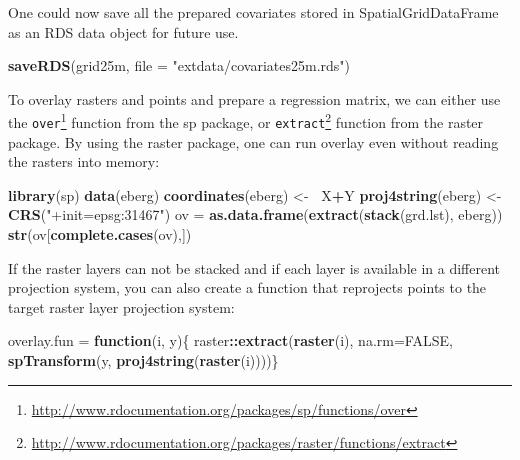 \documentclass[11pt]{krantz}
\newenvironment{Shaded}{\begin{snugshade}}{\end{snugshade}}
\newcommand{\ControlFlowTok}[1]{\textcolor[rgb]{0.27,0.27,0.27}{\textbf{#1}}}
\newcommand{\DataTypeTok}[1]{\textcolor[rgb]{0.27,0.27,0.27}{#1}}
\newcommand{\ErrorTok}[1]{\textcolor[rgb]{0.14,0.14,0.14}{\textbf{#1}}}
\newcommand{\KeywordTok}[1]{\textcolor[rgb]{0.27,0.27,0.27}{\textbf{#1}}}
\newcommand{\NormalTok}[1]{#1}
\newcommand{\OperatorTok}[1]{\textcolor[rgb]{0.43,0.43,0.43}{\textbf{#1}}}
\newcommand{\OtherTok}[1]{\textcolor[rgb]{0.37,0.37,0.37}{#1}}
\newcommand{\StringTok}[1]{\textcolor[rgb]{0.5,0.5,0.5}{#1}}
\renewcommand{\href}[2]{#2\footnote{\url{#1}}}
\theoremstyle{definition}
\theoremstyle{definition}
\theoremstyle{definition}
\theoremstyle{remark}
\begin{document}
One could now save all the prepared covariates stored in
SpatialGridDataFrame as an RDS data object for future use.

\begin{Shaded}
\begin{Highlighting}[]
\KeywordTok{saveRDS}\NormalTok{(grid25m, }\DataTypeTok{file =} \StringTok{"extdata/covariates25m.rds"}\NormalTok{)}
\end{Highlighting}
\end{Shaded}

To overlay rasters and points and prepare a regression matrix, we can
either use the
\href{http://www.rdocumentation.org/packages/sp/functions/over}{\texttt{over}}
function from the sp package, or
\href{http://www.rdocumentation.org/packages/raster/functions/extract}{\texttt{extract}}
function from the raster package. By using the raster package, one can
run overlay even without reading the rasters into memory:

\begin{Shaded}
\begin{Highlighting}[]
\KeywordTok{library}\NormalTok{(sp)}
\KeywordTok{data}\NormalTok{(eberg)}
\KeywordTok{coordinates}\NormalTok{(eberg) <-}\StringTok{ }\ErrorTok{~}\NormalTok{X}\OperatorTok{+}\NormalTok{Y}
\KeywordTok{proj4string}\NormalTok{(eberg) <-}\StringTok{ }\KeywordTok{CRS}\NormalTok{(}\StringTok{"+init=epsg:31467"}\NormalTok{)}
\NormalTok{ov =}\StringTok{ }\KeywordTok{as.data.frame}\NormalTok{(}\KeywordTok{extract}\NormalTok{(}\KeywordTok{stack}\NormalTok{(grd.lst), eberg))}
\KeywordTok{str}\NormalTok{(ov[}\KeywordTok{complete.cases}\NormalTok{(ov),])}
\end{Highlighting}
\end{Shaded}

If the raster layers can not be stacked and if each layer is available
in a different projection system, you can also create a function that
reprojects points to the target raster layer projection system:

\begin{Shaded}
\begin{Highlighting}[]
\NormalTok{overlay.fun =}\StringTok{ }\ControlFlowTok{function}\NormalTok{(i, y)\{}
\NormalTok{  raster}\OperatorTok{::}\KeywordTok{extract}\NormalTok{(}\KeywordTok{raster}\NormalTok{(i), }\DataTypeTok{na.rm=}\OtherTok{FALSE}\NormalTok{, }
      \KeywordTok{spTransform}\NormalTok{(y, }\KeywordTok{proj4string}\NormalTok{(}\KeywordTok{raster}\NormalTok{(i))))\}}
\end{Highlighting}
\end{Shaded}
\end{document}
